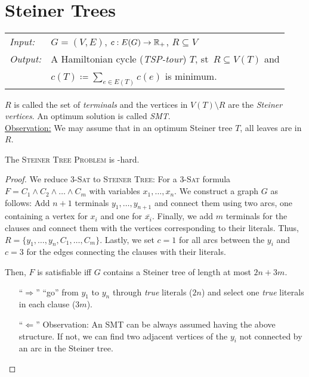 \documentclass[../skript.tex]{subfiles}
\begin{document}
\chapter{Steiner Trees} %
\label{sec:c5}
\begin{problem}
\begin{tabular}{@{}ll}
\textit{Input:} & $G = (V, E)$, $c : E(G) \to \mathbb{R}_+$, $R \subseteq V$ \\
\textit{Output:} & A Hamiltonian cycle (\emph{TSP-tour}) $T$, \ac{st}\ $R \subseteq V(T)$ and \\
& $c(T) \coloneqq \sum_{e \in E(T)} c(e)$ is minimum.
\end{tabular}
\end{problem}
$R$ is called the set of \emph{terminals} and the vertices in $V(T) \setminus R$ are the \emph{Steiner vertices}. An optimum solution is called \emph{\ac{SMT}}. \\
\underline{Observation:} We may assume that in an optimum Steiner tree $T$, all leaves are in $R$.
\begin{theorem} %
\label{thm:61}
The \textsc{Steiner Tree Problem} is \NP-hard.
\end{theorem}
\begin{proof}
We reduce \textsc{3-Sat} to \textsc{Steiner Tree}:
For a \textsc{3-Sat} formula $F = C_1 \wedge C_2 \wedge \ldots \wedge C_m$ with variables $x_1, \ldots, x_n$.
We construct a graph $G$ as follows: Add $n+1$ terminals $y_1, \ldots, y_{n+1}$ and connect them using two arcs, one containing a vertex for $x_i$ and one for $\overline{x_i}$. Finally, we add $m$ terminals for the clauses and connect them with the vertices corresponding to their literals. Thus, $R = \{ y_1, \ldots, y_n, C_1, \ldots, C_m\}$. Lastly, we set $c = 1$ for all arcs between the $y_i$ and $c = 3$ for the edges connecting the clauses with their literals.

Then, $F$ is satisfiable \ac{iff} $G$ contains a Steiner tree of length at most $2n + 3m$.
\begin{itemize}
\item[``$\Rightarrow$''] ``go'' from $y_1$ to $y_n$ through \textit{true} literals ($2n$) and select one \textit{true} literals in each clause ($3m$).
\item[``$\Leftarrow$''] Observation: An \ac{SMT} can be always assumed having the above structure. If not, we can find two adjacent vertices of the $y_i$ not connected by an arc in the Steiner tree.
\end{itemize}
\end{proof}
\end{document}
